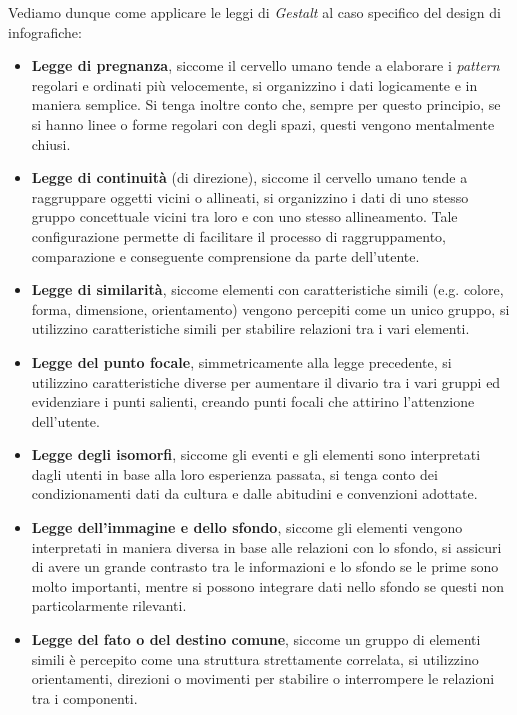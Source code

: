 Vediamo dunque come applicare le leggi di \emph{Gestalt} al caso specifico del design di infografiche:
\begin{itemize}
    \item \textbf{Legge di pregnanza}, siccome il cervello umano tende a elaborare i \emph{pattern} regolari e ordinati più velocemente, si organizzino i dati logicamente e in maniera semplice. 
    Si tenga inoltre conto che, sempre per questo principio, se si hanno linee o forme regolari con degli spazi, questi vengono mentalmente chiusi.    
    \item \textbf{Legge di continuità} (di direzione), siccome il cervello umano tende a raggruppare oggetti vicini o allineati, si organizzino i dati di uno stesso gruppo concettuale vicini tra loro e con uno stesso allineamento. 
    Tale configurazione permette di facilitare il processo di raggruppamento, comparazione e conseguente comprensione da parte dell'utente.     
    \item \textbf{Legge di similarità}, siccome elementi con caratteristiche simili (e.g. colore, forma, dimensione, orientamento) vengono percepiti come un unico gruppo, si utilizzino caratteristiche simili per stabilire relazioni tra i vari elementi.
    \item \textbf{Legge del punto focale}, simmetricamente alla legge precedente, si utilizzino caratteristiche diverse per aumentare il divario tra i vari gruppi ed evidenziare i punti salienti, creando punti focali che attirino l'attenzione dell'utente. 
    \item \textbf{Legge degli isomorfi}, siccome gli eventi e gli elementi sono interpretati dagli utenti in base alla loro esperienza passata, si tenga conto dei condizionamenti dati da cultura e dalle abitudini e convenzioni adottate.
    \item \textbf{Legge dell'immagine e dello sfondo}, siccome gli elementi vengono interpretati in maniera diversa in base alle relazioni con lo sfondo, si assicuri di avere un grande contrasto tra le informazioni e lo sfondo se le prime sono molto importanti, mentre si possono integrare dati nello sfondo se questi non particolarmente rilevanti. 
    \item \textbf{Legge del fato o del destino comune}, siccome un gruppo di elementi simili è percepito come una struttura strettamente correlata, si utilizzino orientamenti, direzioni o movimenti per stabilire o interrompere le relazioni tra i componenti.
\end{itemize}



